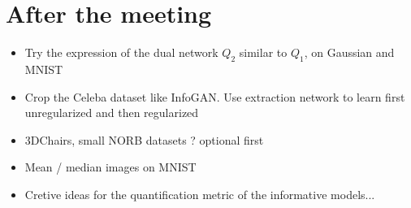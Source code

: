 \documentclass[11pt,a4paper]{article}
\begin{document}
\section{After the meeting}
\begin{itemize}
    \item
        Try the expression of the dual network $Q_2$ similar to $Q_1$, on Gaussian and MNIST
    \item
        Crop the Celeba dataset like InfoGAN. Use extraction network to learn first unregularized and then regularized
    \item
        3DChairs, small NORB datasets ? optional first
    \item
        Mean / median images on MNIST
    \item
        Cretive ideas for the quantification metric of the informative models...
\end{itemize}

% 
% 
% 
% 
% 
% 
% 
% 

\printbibliography{}
\end{document}
